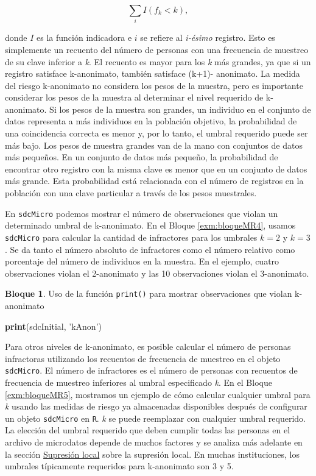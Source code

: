 \documentclass[]{book}
\newenvironment{Shaded}{\begin{snugshade}}{\end{snugshade}}
\newcommand{\KeywordTok}[1]{\textcolor[rgb]{0.13,0.29,0.53}{\textbf{#1}}}
\newcommand{\NormalTok}[1]{#1}
\newcommand{\StringTok}[1]{\textcolor[rgb]{0.31,0.60,0.02}{#1}}
\theoremstyle{definition}
\theoremstyle{definition}
\newtheorem{example}{Bloque}[chapter]
\theoremstyle{definition}
\theoremstyle{definition}
\theoremstyle{remark}
\begin{document}
\[ \sum_{i} I(f_{k}<k), \]

donde \(I\) es la función indicadora e \(i\) se refiere al \emph{i-ésimo} registro. Esto es simplemente un recuento del número de personas con una frecuencia de muestreo de su clave inferior a \emph{k}. El recuento es mayor para los \emph{k} más grandes, ya que si un registro satisface k-anonimato, también satisface (k+1)- anonimato. La medida del riesgo k-anonimato no considera los pesos de la muestra, pero es importante considerar los pesos de la muestra al determinar el nivel requerido de k-anonimato. Si los pesos de la muestra son grandes, un individuo en el conjunto de datos representa a más individuos en la población objetivo, la probabilidad de una coincidencia correcta es menor y, por lo tanto, el umbral requerido puede ser más bajo. Los pesos de muestra grandes van de la mano con conjuntos de datos más pequeños. En un conjunto de datos más pequeño, la probabilidad de encontrar otro registro con la misma clave es menor que en un conjunto de datos más grande. Esta probabilidad está relacionada con el número de registros en la población con una clave particular a través de los pesos muestrales.

En \texttt{sdcMicro} podemos mostrar el número de observaciones que violan un determinado umbral de k-anonimato. En el Bloque \ref{exm:bloqueMR4}, usamos \texttt{sdcMicro} para calcular la cantidad de infractores para los umbrales \(k=2\) y \(k=3\). Se da tanto el número absoluto de infractores como el número relativo como porcentaje del número de individuos en la muestra. En el ejemplo, cuatro observaciones violan el 2-anonimato y las 10 observaciones violan el 3-anonimato.

\begin{example}
\protect\hypertarget{exm:bloqueMR4}{}{\label{exm:bloqueMR4} }Uso de la función \texttt{print()} para mostrar observaciones que violan k-anonimato
\end{example}

\begin{Shaded}
\begin{Highlighting}[]
\KeywordTok{print}\NormalTok{(sdcInitial, }\StringTok{'kAnon'}\NormalTok{)}
\end{Highlighting}
\end{Shaded}

Para otros niveles de k-anonimato, es posible calcular el número de personas infractoras utilizando los recuentos de frecuencia de muestreo en el objeto \texttt{sdcMicro}. El número de infractores es el número de personas con recuentos de frecuencia de muestreo inferiores al umbral especificado \emph{k}. En el Bloque \ref{exm:bloqueMR5}, mostramos un ejemplo de cómo calcular cualquier umbral para \emph{k} usando las medidas de riesgo ya almacenadas disponibles después de configurar un objeto \texttt{sdcMicro} en \texttt{R}. \emph{k} se puede reemplazar con cualquier umbral requerido. La elección del umbral requerido que deben cumplir todas las personas en el archivo de microdatos depende de muchos factores y se analiza más adelante en la sección \protect\hyperlink{sup-loc}{Supresión local} sobre la supresión local. En muchas instituciones, los umbrales típicamente requeridos para k-anonimato son 3 y 5.
\end{document}
